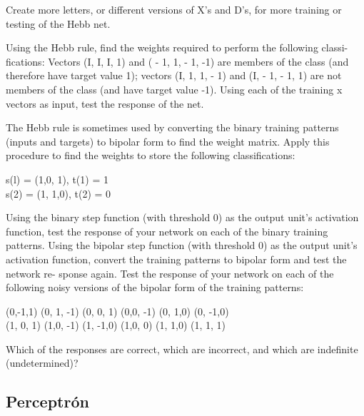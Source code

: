 \begin{problem}[4]
Create more letters, or different versions of X's and D's, for more training or testing
of the Hebb net.


\solution

\end{problem}

\begin{problem}[5]
\ppart Using the Hebb rule, find the weights required to perform the following classi-
fications: Vectors (I, I, I, 1) and ( - 1, 1, - 1, -1) are members of the class (and
therefore have target value 1); vectors (I, 1, 1, - 1) and (I, - 1, - 1, 1) are not
members of the class (and have target value -1).
\ppart Using each of the training x vectors as input, test the response of the net.


\solution

\end{problem}

\begin{problem}[6]
\ppart The Hebb rule is sometimes used by converting the binary training patterns (inputs
and targets) to bipolar form to find the weight matrix. Apply this procedure to
find the weights to store the following classifications:
\begin{center}
s(l) = (1,0, 1), t(1) = 1\\
s(2) = (1, 1,0), t(2) = 0
\end{center}
\ppart Using the binary step function (with threshold 0) as the output unit's activation
function, test the response of your network on each of the binary training patterns.
\ppart Using the bipolar step function (with threshold 0) as the output unit's activation
function, convert the training patterns to bipolar form and test the network re-
sponse again.
\ppart Test the response of your network on each of the following noisy versions of the
bipolar form of the training patterns:
\begin{center}
(0,-1,1) (0, 1, -1) (0, 0, 1) (0,0, -1) (0, 1,0) (0, -1,0)\\
(1, 0, 1) (1,0, -1) (1, -1,0) (1,0, 0) (1, 1,0) (1, 1, 1)
\end{center}
Which of the responses are correct, which are incorrect, and which are indefinite
(undetermined)?

\solution

\end{problem}

\subsection{Perceptrón}

